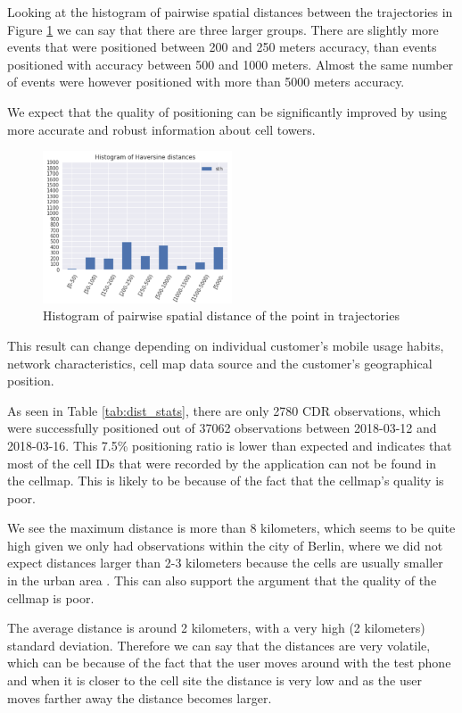 Looking at the histogram of pairwise spatial distances between the trajectories in Figure \ref{fig:hist} we can say that there are three larger groups. There are slightly more events that were positioned between 200 and 250 meters accuracy, than events positioned with accuracy between 500 and 1000 meters. Almost the same number of events were however positioned with more than 5000 meters accuracy.

We expect that the quality of positioning can be significantly improved by using more accurate and robust information about cell towers.

\begin{figure}[h]
    \centering
    \includegraphics[width=0.5\textwidth]{images/hist.png}
    \caption{Histogram of pairwise spatial distance of the point in trajectories}
    \label{fig:hist}
\end{figure}

This result can change depending on individual customer's mobile usage habits, network characteristics, cell map data source and the customer's geographical position.

As seen in Table \ref{tab:dist_stats}, there are only 2780 CDR observations, which were successfully positioned out of 37062 observations between 2018-03-12 and 2018-03-16. This 7.5\% positioning ratio is lower than expected and indicates that most of the cell IDs that were recorded by the application can not be found in the cellmap. This is likely to be because of the fact that the cellmap's quality is poor.

We see the maximum distance is more than 8 kilometers, which seems to be quite high given we only had observations within the city of Berlin, where we did not expect distances larger than 2-3 kilometers because the cells are usually smaller in the urban area \cite{cell-site}. This can also support the argument that the quality of the cellmap is poor.

The average distance is around 2 kilometers, with a very high (2 kilometers) standard deviation. Therefore we can say that the distances are very volatile, which can be because of the fact that the user moves around with the test phone and when it is closer to the cell site the distance is very low and as the user moves farther away the distance becomes larger.


